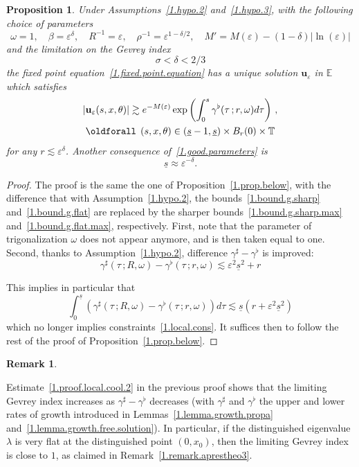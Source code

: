 \documentclass[10pt]{amsart}
\newtheorem{prop}[cdrthm]{Proposition}
\theoremstyle{definition}
\newtheorem{rema}[cdrthm]{Remark}
\theoremstyle{plain}
\newcommand*\e{\varepsilon}
\newcommand*\EE{{\mathbb E}}
\newcommand*\g{\gamma}
\newcommand{\ubf}{{\mathbf u}}
\newcommand*\und{\underline}
\renewcommand*{\forall}{\mathrel{\oldforall}}
\begin{document}
\begin{prop}\label{1.prop.below.max}
Under Assumptions~\ref{1.hypo.2} and~\ref{1.hypo.3}, with the following choice of parameters
\begin{equation}
\label{1.good.parameters.max}
\omega = 1, \quad \beta = \e^{\delta}, \quad R^{-1} = \e, \quad \rho^{-1} = \e^{1-\delta/2}, \quad M' = M(\e) - (1-\delta)|\ln(\e)|
\end{equation}
and the limitation on the Gevrey index
\[
\sigma < \delta <2/3
\]
the fixed point equation~\eqref{1.fixed.point.equation} has a unique solution $\ubf_{\e}$ in $\EE$ which satisfies
\begin{multline}
|\ubf_{\e}(s,x,\theta)| \gtrsim e^{-M(\e)} \exp \left(\int_{0}^{s} \g^{\flat}(\tau\,; r, \omega) d\tau \right) \,, \\
\forall\,(s,x,\theta)\in(\und{s} - 1, \und{s}) \times B_r(0)\times\mathbb{T}
\end{multline}
for any $r \lesssim \e^{\delta}$. Another consequence of~\eqref{1.good.parameters} is
\begin{equation}
\label{1.final.und.s.max}
\und{s} \approx \e^{-\delta}.
\end{equation}
\end{prop}

\begin{proof}
The proof is the same the one of Proposition~\ref{1.prop.below}, with the difference that with Assumption~\ref{1.hypo.2}, the bounds~\eqref{1.bound.g.sharp} and~\eqref{1.bound.g.flat} are replaced by the sharper bounds~\eqref{1.bound.g.sharp.max} and~\eqref{1.bound.g.flat.max}, respectively. First, note that the parameter of trigonalization $\omega$ does not appear anymore, and is then taken equal to one. Second, thanks to Assumption~\ref{1.hypo.2}, difference $\g^{\sharp} - \g^{\flat}$ is improved:
\begin{equation}
\label{1.proof.local.cool.2}
\g^{\sharp}(\tau\, ; R,\omega) - \g^{\flat}(\tau\, ; r,\omega) \lesssim \e^{2}\und{s}^{2} + r
\end{equation}

This implies in particular that
\[
\int_{0}^{\und{s}} (\g^{\sharp}(\tau\, ; R,\omega) - \g^{\flat}(\tau\, ; r,\omega)) d\tau \lesssim \und{s}\left(r + \e^{2}\und{s}^2 \right)
\]
which no longer implies constraints~\eqref{1.local.cons}. It suffices then to follow the rest of the proof of Proposition~\ref{1.prop.below}.
\end{proof}

\begin{rema}\label{1.remark.amelioration}

Estimate~\eqref{1.proof.local.cool.2} in the previous proof shows that the limiting Gevrey index increases as $\g^{\sharp} - \g^{\flat}$ decreases (with $\g^{\sharp}$ and $\g^{\flat}$ the upper and lower rates of growth introduced in Lemmas~\ref{1.lemma.growth.propa} and~\ref{1.lemma.growth.free.solution}). In particular, if the distinguished eigenvalue $\lambda$ is very flat at the distinguished point $(0,x_0)$, then the limiting Gevrey index is close to $1$, as claimed in Remark~\ref{1.remark.aprestheo3}.
\end{rema}
\end{document}

